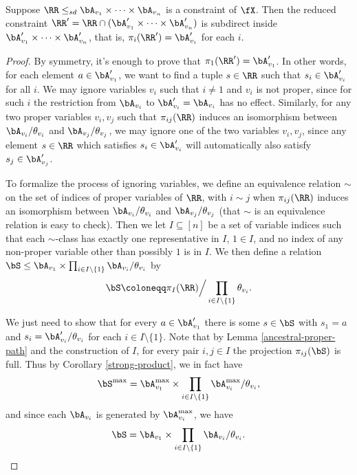 \begin{lem}\label{ancestral-red-arc} Suppose $\RR \le_{sd} \bA_{v_1} \times \cdots \times \bA_{v_n}$ is a constraint of $\fX$. Then the reduced constraint $\RR' = \RR \cap (\bA_{v_1}' \times \cdots \times \bA_{v_n}')$ is subdirect inside $\bA_{v_1}' \times \cdots \times \bA_{v_n}'$, that is, $\pi_i(\RR') = \bA_{v_i}'$ for each $i$.
\end{lem}
\begin{proof} By symmetry, it's enough to prove that $\pi_1(\RR') = \bA_{v_1}'$. In other words, for each element $a \in \bA_{v_1}'$, we want to find a tuple $s \in \RR$ such that $s_i \in \bA_{v_i}'$ for all $i$. We may ignore variables $v_i$ such that $i \ne 1$ and $v_i$ is not proper, since for such $i$ the restriction from $\bA_{v_i}$ to $\bA_{v_i}' = \bA_{v_i}$ has no effect. Similarly, for any two proper variables $v_i, v_j$ such that $\pi_{ij}(\RR)$ induces an isomorphism between $\bA_{v_i}/\theta_{v_i}$ and $\bA_{v_j}/\theta_{v_j}$, we may ignore one of the two variables $v_i, v_j$, since any element $s \in \RR$ which satisfies $s_i \in \bA_{v_i}'$ will automatically also satisfy $s_j \in \bA_{v_j}'$.

To formalize the process of ignoring variables, we define an equivalence relation $\sim$ on the set of indices of proper variables of $\RR$, with $i \sim j$ when $\pi_{ij}(\RR)$ induces an isomorphism between $\bA_{v_i}/\theta_{v_i}$ and $\bA_{v_j}/\theta_{v_j}$ (that $\sim$ is an equivalence relation is easy to check). Then we let $I \subseteq [n]$ be a set of variable indices such that each $\sim$-class has exactly one representative in $I$, $1 \in I$, and no index of any non-proper variable other than possibly $1$ is in $I$. We then define a relation $\bS \le \bA_{v_1} \times \prod_{i \in I \setminus\{1\}} \bA_{v_i}/\theta_{v_i}$ by
\[
\bS \coloneqq \pi_I(\RR)\Big/\prod_{i \in I \setminus\{1\}} \theta_{v_i}.
\]

We just need to show that for every $a \in \bA_{v_1}'$ there is some $s \in \bS$ with $s_1 = a$ and $s_i = \bA_{v_i}'/\theta_{v_i}$ for each $i \in I \setminus\{1\}$. Note that by Lemma \ref{ancestral-proper-path} and the construction of $I$, for every pair $i,j \in I$ the projection $\pi_{ij}(\bS)$ is full. Thus by Corollary \ref{strong-product}, we in fact have
\[
\bS^{\max} = \bA_{v_1}^{\max} \times \prod_{i \in I \setminus\{1\}} \bA_{v_i}^{\max}/\theta_{v_i},
\]
and since each $\bA_{v_i}$ is generated by $\bA_{v_i}^{\max}$, we have
\[
\bS = \bA_{v_1} \times \prod_{i \in I \setminus\{1\}} \bA_{v_i}/\theta_{v_i}.\qedhere
\]
\end{proof}

